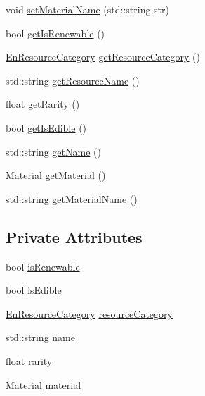 \begin{DoxyCompactItemize}
\item 
void \mbox{\hyperlink{class_resource_a43801faadac24460d3266d5cbc2940f9}{set\+Material\+Name}} (std\+::string str)
\item 
bool \mbox{\hyperlink{class_resource_a268644c83ddc06f22cd8877be98ebaaf}{get\+Is\+Renewable}} ()
\item 
\mbox{\hyperlink{_resource_8hpp_abde177ff256dcb25ea4a492ad7335b82}{En\+Resource\+Category}} \mbox{\hyperlink{class_resource_abe11e435e757baea37ca3dde8e01937a}{get\+Resource\+Category}} ()
\item 
std\+::string \mbox{\hyperlink{class_resource_a96943da326e03738d7adfa378f733f2e}{get\+Resource\+Name}} ()
\item 
float \mbox{\hyperlink{class_resource_ad08704ca1b53b09a0f7e84933c23b100}{get\+Rarity}} ()
\item 
bool \mbox{\hyperlink{class_resource_a5cca32bbe54dd0b45266225b6685c95b}{get\+Is\+Edible}} ()
\item 
std\+::string \mbox{\hyperlink{class_resource_af16ad4255d82bea0bfa2c9ff2faeb596}{get\+Name}} ()
\item 
\mbox{\hyperlink{class_material}{Material}} \mbox{\hyperlink{class_resource_a931df727dee149b73f9e10e228e7807a}{get\+Material}} ()
\item 
std\+::string \mbox{\hyperlink{class_resource_acdeb90b10c0e8b2837997525468ab5c3}{get\+Material\+Name}} ()
\end{DoxyCompactItemize}
\subsection*{Private Attributes}
\begin{DoxyCompactItemize}
\item 
bool \mbox{\hyperlink{class_resource_aaeaf23c3f1041f48524420b8b072c2b6}{is\+Renewable}}
\item 
bool \mbox{\hyperlink{class_resource_a0be3a5c7102decd8b33c86519daff91c}{is\+Edible}}
\item 
\mbox{\hyperlink{_resource_8hpp_abde177ff256dcb25ea4a492ad7335b82}{En\+Resource\+Category}} \mbox{\hyperlink{class_resource_abd62faeba4842d268aec4ae236346850}{resource\+Category}}
\item 
std\+::string \mbox{\hyperlink{class_resource_a2470c0f38c44ae45229e2eb0d6ea1881}{name}}
\item 
float \mbox{\hyperlink{class_resource_a774ee87148c3228a17f23ff7e9788fb9}{rarity}}
\item 
\mbox{\hyperlink{class_material}{Material}} \mbox{\hyperlink{class_resource_a303fe9dde652299164dfe1dec5f10670}{material}}
\end{DoxyCompactItemize}
